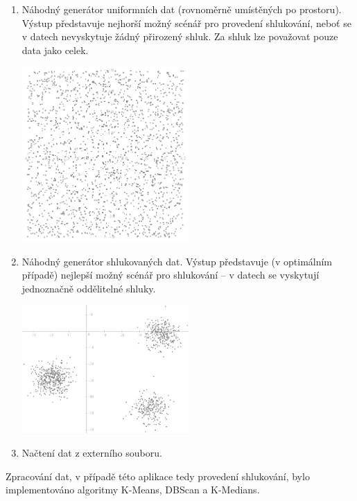 \documentclass[pdftex,a4paper]{article}
\begin{document}
\begin{enumerate}
	
	\item Náhodný generátor uniformních dat (rovnoměrně umístěných po prostoru). Výstup představuje nejhorší možný scénář pro provedení shlukování, neboť se v datech nevyskytuje žádný přirozený shluk. Za shluk lze považovat pouze data jako celek.
	\begin{center}
		\includegraphics[width=0.5\textwidth]{res/datauniform.png}
	\end{center}

	\newpage

	\item Náhodný generátor shlukovaných dat. Výstup představuje (v optimálním případě) nejlepší možný scénář pro shlukování -- v datech se vyskytují jednoznačně oddělitelné shluky.
	\begin{center}
		\includegraphics[width=0.5\textwidth]{res/dataclustered.png}
	\end{center}

	\item Načtení dat z externího souboru.
\end{enumerate}

\noindent
Zpracování dat, v případě této aplikace tedy provedení shlukování, bylo implementováno algoritmy K-Means, DBScan a K-Medians.
\end{document}
